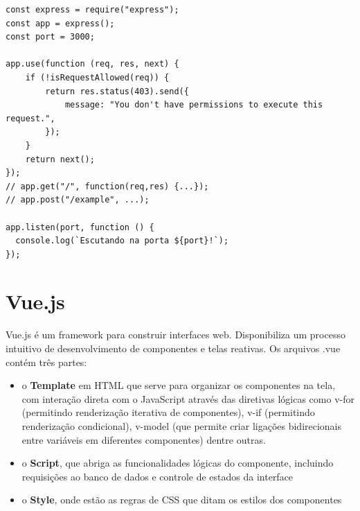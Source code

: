 \begin{lstlisting}
const express = require("express");
const app = express();
const port = 3000;

app.use(function (req, res, next) {
    if (!isRequestAllowed(req)) {
        return res.status(403).send({
            message: "You don't have permissions to execute this request.",
        });
    }
    return next();
});
// app.get("/", function(req,res) {...});
// app.post("/example", ...);

app.listen(port, function () {
  console.log(`Escutando na porta ${port}!`);
});
\end{lstlisting}
\section{Vue.js}

Vue.js é um framework para construir interfaces web. Disponibiliza um processo intuitivo de desenvolvimento de componentes e telas reativas. Os arquivos .vue contém três partes:
\begin{itemize}
    \item o \textbf{Template} em HTML que serve para organizar os componentes na tela, com interação direta com o JavaScript através das diretivas lógicas como v-for (permitindo renderização iterativa de componentes), v-if (permitindo renderização condicional), v-model (que permite criar ligações bidirecionais entre variáveis em diferentes componentes) dentre outras.
    \item o \textbf{Script}, que abriga as funcionalidades lógicas do componente, incluindo requisições ao banco de dados e controle de estados da interface
    \item o \textbf{Style}, onde estão as regras de CSS que ditam os estilos dos componentes
\end{itemize}
